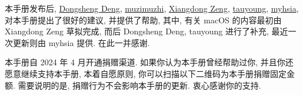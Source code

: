 本手册发布后,
\href{https://github.com/EthanDeng}{Dongsheng Deng},
\href{https://github.com/muzimuzhi}{muzimuzhi},
\href{https://github.com/stone-zeng}{Xiangdong Zeng},
\href{https://github.com/tauyoungsama}{tauyoung},
\href{https://github.com/myhsia}{myhsia},
对本手册提出了很好的建议, 并提供了帮助,
其中, 有关 macOS 的内容最初由 Xiangdong Zeng 草拟完成,
而后 Dongsheng Deng, tauyoung 进行了补充,
最近一次更新则由 myhsia 提供.
在此一并感谢.

本手册自 2024 年 4 月开通捐赠渠道.
如果你认为本手册曾经帮助过你,
并且你还愿意继续支持本手册,
本着自愿原则,
你可以扫描以下二维码为本手册捐赠固定金额.
需要说明的是,
捐赠行为不会影响本手册的更新.
衷心感谢你的支持.

\begin{center}
   \qquad
\end{center}
